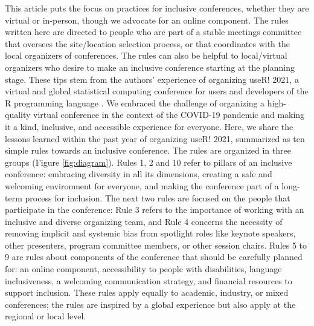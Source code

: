 \documentclass[10pt,letterpaper]{article}
\begin{document}
This article puts the focus on practices for inclusive conferences, whether they are virtual or in-person, though we advocate for an online component. 
The rules written here are directed to people who are part of a stable meetings committee that oversees the site/location selection process, or that coordinates with the local organizers of conferences.
The rules can also be helpful to local/virtual organizers who desire to make an inclusive conference starting at the planning stage.
These tips stem from the authors' experience of organizing useR! 2021, a virtual and global statistical computing conference for users and developers of the R programming language \cite{r_core_team_2021}. 
We embraced the challenge of organizing a high-quality virtual conference in the context of the COVID-19 pandemic and making it a kind, inclusive, and accessible experience for everyone. 
Here, we share the lessons learned within the past year of organizing useR! 2021, summarized as ten simple rules towards an inclusive conference.
The rules are organized in three groups (Figure \ref{fig:diagram}). %
Rules 1, 2 and 10 refer to pillars of an inclusive conference: embracing diversity in all its dimensions, creating a safe and welcoming environment for everyone, and making the conference part of a long-term process for inclusion.
The next two rules are focused on the people that participate in the conference: 
Rule 3 refers to the importance of working with an inclusive and diverse organizing team, and Rule 4 concerns the necessity of removing implicit and systemic bias from spotlight roles like keynote speakers, other presenters, program committee members, or other session chairs. 
Rules 5 to 9 are rules about components of the conference that should be carefully planned for: an online component, accessibility to people with disabilities, language inclusiveness, a welcoming communication strategy, and financial resources to support inclusion. 
These rules apply equally to academic, industry, or mixed conferences; the rules are inspired by a global experience but also apply at the regional or local level.
\end{document}
